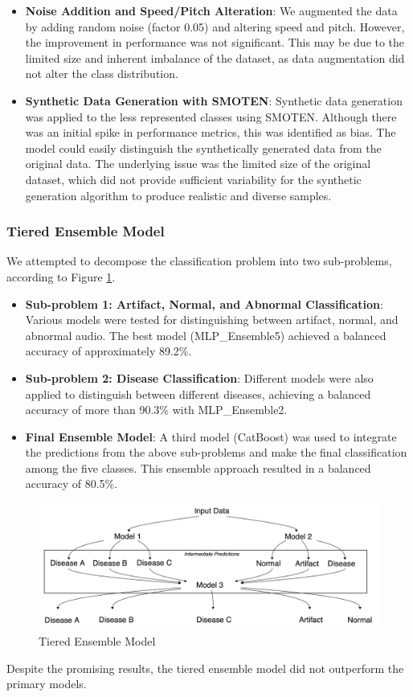 \begin{itemize}[leftmargin=*]
    \item \textbf{Noise Addition and Speed/Pitch Alteration}: We augmented the data by adding random noise (factor 0.05)
    and altering speed and pitch. However, the improvement in performance was not significant. 
    This may be due to the limited size and inherent imbalance of the dataset, as data augmentation 
    did not alter the class distribution.
    \item \textbf{Synthetic Data Generation with SMOTEN}: Synthetic data generation was applied to the 
    less represented classes using SMOTEN. Although there was an initial spike in performance metrics, 
    this was identified as bias. The model could easily distinguish the synthetically generated data from 
    the original data. The underlying issue was the limited size of the original dataset, which did not 
    provide sufficient variability for the synthetic generation algorithm to produce realistic 
    and diverse samples.
\end{itemize}

\subsubsection{Tiered Ensemble Model}

We attempted to decompose the classification problem into two sub-problems, according to Figure \ref{fig:tiered_ensemble}.

\begin{itemize}[leftmargin=*]
    \item \textbf{Sub-problem 1: Artifact, Normal, and Abnormal Classification}: Various models were 
    tested for distinguishing between artifact, normal, and abnormal audio. The best model 
    (MLP\_Ensemble5) achieved a balanced accuracy of approximately 89.2\%.
    \item \textbf{Sub-problem 2: Disease Classification}: Different models were also applied to 
    distinguish between different diseases, achieving a balanced accuracy of more than 90.3\% with MLP\_Ensemble2.
    \item \textbf{Final Ensemble Model}: A third model (CatBoost) was used to integrate the predictions 
    from the above sub-problems and make the final classification among the five classes. This ensemble 
    approach resulted in a balanced accuracy of 80.5\%.
\end{itemize}

\begin{figure}[H]
    \centering
    \includegraphics[width=1\columnwidth]{images/tiered_ensemble.png}
    \caption{Tiered Ensemble Model}
    \label{fig:tiered_ensemble}
\end{figure}

\noindent
Despite the promising results, the tiered ensemble model did not outperform the primary models.
